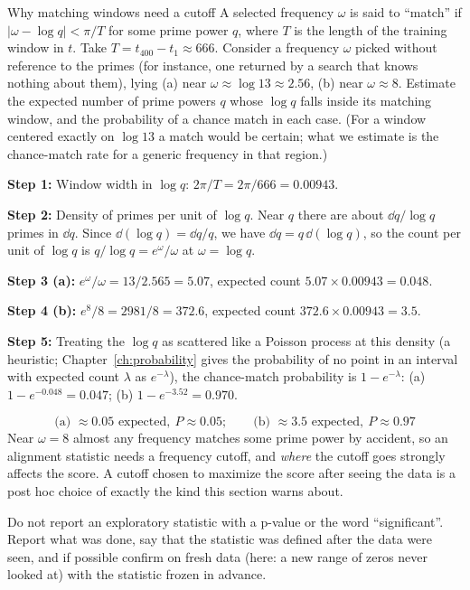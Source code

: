 \begin{sample}{Why matching windows need a cutoff}
A selected frequency $\omega$ is said to ``match'' if $|\omega-\log q|<\pi/T$ for some prime power $q$, where $T$ is the length of the training window in $t$. Take $T=t_{400}-t_1\approx666$. Consider a frequency $\omega$ picked without reference to the primes (for instance, one returned by a search that knows nothing about them), lying (a) near $\omega\approx\log13\approx2.56$, (b) near $\omega\approx8$. Estimate the expected number of prime powers $q$ whose $\log q$ falls inside its matching window, and the probability of a chance match in each case. (For a window centered exactly on $\log13$ a match would be certain; what we estimate is the chance-match rate for a generic frequency in that region.)

\textbf{Step 1:} Window width in $\log q$: $2\pi/T=2\pi/666=0.00943$.

\textbf{Step 2:} Density of primes per unit of $\log q$. Near $q$ there are about $\dd q/\log q$ primes in $\dd q$. Since $\dd(\log q)=\dd q/q$, we have $\dd q=q\,\dd(\log q)$, so the count per unit of $\log q$ is $q/\log q=e^\omega/\omega$ at $\omega=\log q$.

\textbf{Step 3 (a):} $e^\omega/\omega=13/2.565=5.07$, expected count $5.07\times0.00943=0.048$.

\textbf{Step 4 (b):} $e^8/8=2981/8=372.6$, expected count $372.6\times0.00943=3.5$.

\textbf{Step 5:} Treating the $\log q$ as scattered like a Poisson process at this density (a heuristic; Chapter~\ref{ch:probability} gives the probability of no point in an interval with expected count $\lambda$ as $e^{-\lambda}$), the chance-match probability is $1-e^{-\lambda}$: (a) $1-e^{-0.048}=0.047$; (b) $1-e^{-3.52}=0.970$.

\[
\boxed{\text{(a) }\approx0.05\text{ expected},\ P\approx0.05;\qquad\text{(b) }\approx3.5\text{ expected},\ P\approx0.97}
\]
Near $\omega=8$ almost any frequency matches some prime power by accident, so an alignment statistic needs a frequency cutoff, and \emph{where} the cutoff goes strongly affects the score. A cutoff chosen to maximize the score after seeing the data is a post hoc choice of exactly the kind this section warns about.
\end{sample}

\begin{pitfall}
Do not report an exploratory statistic with a p-value or the word ``significant''. Report what was done, say that the statistic was defined after the data were seen, and if possible confirm on fresh data (here: a new range of zeros never looked at) with the statistic frozen in advance.
\end{pitfall}

